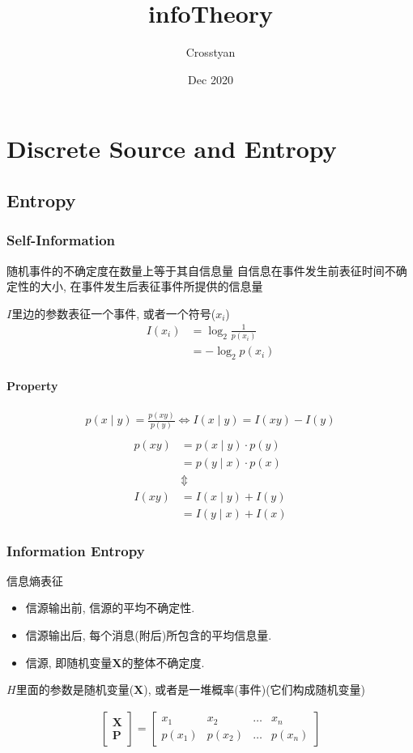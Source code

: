 \documentclass[a4paper]{report}
\title{infoTheory}
\author{Crosstyan}
\date{Dec 2020}
\begin{document}
\chapter{Discrete Source and Entropy}
\section{Entropy}
\subsection{Self-Information}
随机事件的不确定度在数量上等于其自信息量
自信息在事件发生前表征时间不确定性的大小, 在事件发生后表征事件所提供的信息量

$I$里边的参数表征一个事件, 或者一个符号($x_i$)
\begin{align}
  I(x_i)&=\log_2{\frac{1}{p(x_i)}}\\
  &=-\log_2{p(x_i)}
\end{align}

\subsubsection{Property}
\begin{align*}
  p(x\mid y)=\frac{p(xy)}{p(y)} \Leftrightarrow  I(x\mid y)=I(xy)-I(y)\\
\end{align*}
\begin{align*}
  p(xy)&=p(x\mid y)\cdot p(y)\\
  &=p(y\mid x)\cdot p(x)\\
  &\Updownarrow\\
  I(xy)&=I(x\mid y)+I(y)\\
  &=I(y\mid x)+I(x)
\end{align*}

\subsection{Information Entropy}
信息熵表征
\begin{itemize}
  \item 信源输出前, 信源的平均不确定性. 
  \item 信源输出后, 每个消息(附后)所包含的平均信息量. 
  \item 信源, 即随机变量$\textbf{X}$的整体不确定度. 
\end{itemize}
$H$里面的参数是随机变量($\textbf{X}$), 或者是一堆概率(事件)(它们构成随机变量)

\begin{gather}
\begin{bmatrix}
  \textbf{X}\\\textbf{P}
\end{bmatrix}=
\begin{bmatrix}
  x_1 & x_2 & \dots & x_n\\
  p(x_1) & p(x_2)&\dots&p(x_n)
\end{bmatrix}
\end{gather}
\end{document}
